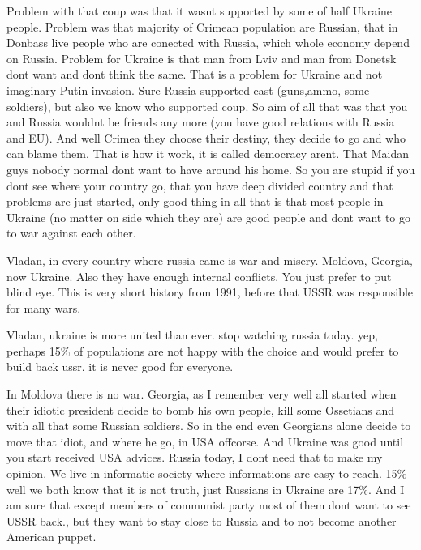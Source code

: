 \begin{itemize}
\begin{itemize}
Problem with that coup was that it wasnt supported by some of half Ukraine
people. Problem was that majority of Crimean population are Russian, that in
Donbass live people who are conected with Russia, which whole economy depend on
Russia. Problem for Ukraine is that man from Lviv and man from Donetsk dont
want and dont think the same. That is a problem for Ukraine and not imaginary
Putin invasion. Sure Russia supported east (guns,ammo, some soldiers), but also
we know who supported coup. So aim of all that was that you and Russia wouldnt
be friends any more (you have good relations with Russia and EU). And well
Crimea they choose their destiny, they decide to go and who can blame them.
That is how it work, it is called democracy arent. That Maidan guys nobody
normal dont want to have around his home. So you are stupid if you dont see
where your country go, that you have deep divided country and that problems are
just started, only good thing in all that is that most people in Ukraine (no
matter on side which they are) are good people and dont want to go to war
against each other.


Vladan, in every country where russia came is war and misery. Moldova, Georgia,
now Ukraine. Also they have enough internal conflicts. You just prefer to put
blind eye. This is very short history from 1991, before that USSR was
responsible for many wars.


Vladan, ukraine is more united than ever. stop watching russia today. yep,
perhaps 15\% of populations are not happy with the choice and would prefer to
build back ussr. it is never good for everyone.


In Moldova there is no war. Georgia, as I remember very well all started when
their idiotic president decide to bomb his own people, kill some Ossetians and
with all that some Russian soldiers. So in the end even Georgians alone decide
to move that idiot, and where he go, in USA offcorse. And Ukraine was good
until you start received USA advices. Russia today, I dont need that to make my
opinion. We live in informatic society where informations are easy to reach.
15\% well we both know that it is not truth, just Russians in Ukraine are 17\%.
And I am sure that except members of communist party most of them dont want to
see USSR back., but they want to stay close to Russia and to not become another
American puppet.



\end{itemize}
\end{itemize}
